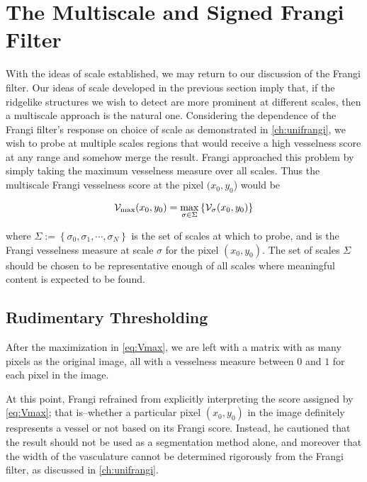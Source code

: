  \chapter{The Multiscale and Signed Frangi Filter} \label{ch:multifrangi}
    
     With the ideas of scale established, we may return to our discussion of the Frangi filter.
    Our ideas of scale developed in the previous section imply that, if the ridgelike structures we wish to detect are more prominent at different scales, then a multiscale approach is the natural one. Considering the dependence of the Frangi filter's response on choice of scale as demonstrated in \cref{ch:unifrangi}, we wish to probe at multiple scales
    regions that would receive a high vesselness score at any range and somehow merge the result. Frangi \cite{frangi-paper} approached this problem by simply taking the maximum vesselness measure over all scales. Thus the multiscale Frangi vesselness score at the pixel $(x_0, y_0$) would be 
    
    \begin{equation} \label{eq:Vmax}
    \mathcal{V}_{\max}(x_0, y_0) =
    	\underset{\sigma \in \Sigma}{\max}\left\{  \mathcal{V}_{\sigma} (x_0, y_0) \right\}
    \end{equation}
    
    where $\Sigma := \left\{ \sigma_0, \sigma_1 , \cdots, \sigma_N \right\}$ is
    the set of scales at which to probe, and \Vsigma is the Frangi vesselness measure at scale $\sigma$ for the pixel $(x_0,y_0)$. The set of scales $\Sigma$ should be chosen to be representative enough of all scales where meaningful content is expected to be found.
    
   
    \section{Rudimentary Thresholding}
    
    After the maximization in \cref{eq:Vmax}, we are left with a matrix with as many pixels as the original image, all with a vesselness measure between $0$ and $1$ for each pixel in the image.
         
    At this point, Frangi \cite{frangi-paper} refrained from explicitly interpreting the score assigned by \cref{eq:Vmax}; that is--whether a particular pixel $(x_0,y_0)$ in the image definitely respresents a vessel or not based on its Frangi score. Instead, he cautioned that the result should not be used as a segmentation method alone, and moreover that the width of the vasculature cannot be determined rigorously from the Frangi filter, as discussed in \cref{ch:unifrangi}.
   
